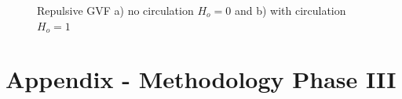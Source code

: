 \documentclass[numbered,pdftex]{ohio-etd}
\begin{document}
\begin{figure}[H]
	\begin{subfigmatrix}{2}%
		\centering	
		\hspace*{0mm}
	\end{subfigmatrix}
	\caption{Repulsive GVF a) no circulation $H_o=0$ and b) with circulation $H_o=1$}
	\label{fig:decayApplied}
\end{figure} 


\chapter{Appendix - Methodology Phase III}
\end{document}
